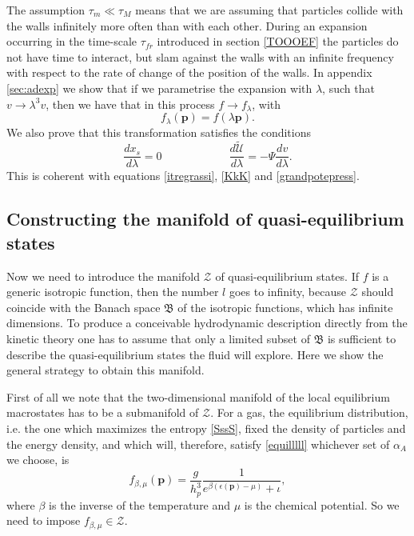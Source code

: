 \documentclass[useAMS,usenatbib,prd,twocolumn,nofootinbib]{revtex4-1}
\newcommand{\vect}[1]{\mathbf{{#1}}}
\newcommand{\spc}{\quad \quad \quad}
\begin{document}
The assumption $\tau_m \ll \tau_M$ means that we are assuming that particles collide with the walls infinitely more often than with each other. During an expansion occurring in the time-scale $\tau_{fr}$ introduced in section \ref{TOOOEF} the particles do not have time to interact, but slam against the walls with an infinite frequency with respect to the rate of change of the position of the walls. In appendix \ref{sec:adexp} we show that if we parametrise the expansion with $\lambda$, such that $v \rightarrow \lambda^3 v$, then we have that in this process $f \rightarrow f_\lambda$, with
\begin{equation}\label{adexpsion}
f_\lambda (\vect{p}) = f(\lambda \vect{p}).
\end{equation}
We also prove that this transformation satisfies the conditions
\begin{equation}
 \dfrac{dx_s}{d\lambda} =0 \spc  \spc  \dfrac{d \tilde{\mathcal{U}}}{d\lambda} = -\Psi \dfrac{d v}{d \lambda}.
\end{equation}
This is coherent with equations \eqref{itregrassi}, \eqref{KkK} and \eqref{grandpotepress}.

\subsection{Constructing the manifold of quasi-equilibrium states}

Now we need to introduce the manifold $\mathcal{Z}$ of quasi-equilibrium states. If  $f$ is a generic isotropic function, then the number $l$ goes to infinity, because $\mathcal{Z}$ should coincide with the Banach space $\mathfrak{B}$ of the isotropic functions, which has infinite dimensions. 
To produce a conceivable hydrodynamic description directly from the kinetic theory one has to assume that only a limited subset of $\mathfrak{B}$ is sufficient to describe the quasi-equilibrium states the fluid will explore. Here we show the general strategy to obtain this manifold.

First of all we note that the two-dimensional manifold of the local equilibrium macrostates has to be a submanifold of $\mathcal{Z}$. 
For a gas, the equilibrium distribution, i.e. the one which maximizes the entropy \eqref{SssS}, fixed the density of particles and the energy density, and which will, therefore, satisfy \eqref{equilllll} whichever set of $\alpha_A$ we choose, is
\begin{equation}
f_{\beta,\mu}(\vect{p}) =\dfrac{g}{h_p^3} \dfrac{1}{e^{\beta (\epsilon(\vect{p})-\mu)} + \iota},
\end{equation}
where $\beta$ is the inverse of the temperature and $\mu$ is the chemical potential. So we need to impose $f_{\beta,\mu} \in \mathcal{Z}$.
\end{document}
